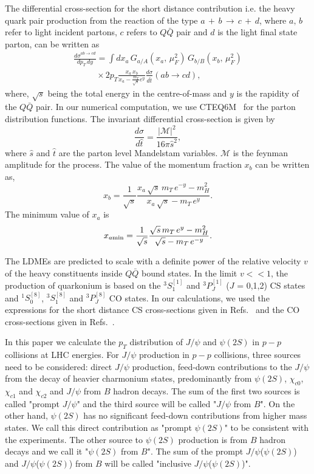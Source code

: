 \documentclass{iopart}
\def  \be   {\begin{equation}}
\def  \ee   {\end{equation}}
\def  \bea  {\begin{eqnarray}}
\def  \eea  {\end{eqnarray}}
\def  \nn   {\nonumber}
\begin{document}
The differential cross-section for the short distance contribution i.e. the heavy quark pair production from the reaction of the type $a\,+\,b\,\rightarrow\,c\,+\,d$, where $a,\, b$ refer  to light incident partons, $c$ refers to $Q\bar Q$ pair and $d$ is the light final state parton, can be written as~\cite{rmp59}
\bea
\frac{{d\sigma}^{ab\rightarrow cd}}{dp_T\,dy} = \int dx_a\, G_{a/A}(x_a,\,\mu^{2}_{F})\, G_{b/B}(x_b,\,\mu^{2}_{F})\nn\\
~~~~~~~~~~~~\times 2p_T \frac{x_a\,x_b}{x_a-\frac{m_T}{\sqrt{s}}e^y}\frac{d\sigma}{d\hat t}(ab\rightarrow cd),
\eea
where, $\sqrt{s}$ being the total energy in the centre-of-mass and $y$ is the rapidity of the $Q\bar Q$ pair. In our numerical computation, we use CTEQ6M~\cite{prd82} for the parton distribution functions. The invariant differential cross-section is given by
\be
\frac{d\sigma}{d\hat t} = \frac{|\mathcal{M}|^2}{16\pi{\hat s}^2},
\ee
where $\hat s$ and $\hat t$ are the parton level Mandelstam variables. $\mathcal{M}$ is the feynman amplitude for the process. The value of the momentum fraction $x_b$ can be written as,
\be
x_b = \frac{1}{\sqrt{s}}\frac{x_a\,\sqrt{s}\,m_T\,e^{-y}-m^2_H}{x_a\,\sqrt{s}-m_T\,e^y}.
\ee
The minimum value of $x_a$ is 
\be
x_{a\rm min} = \frac{1}{\sqrt{s}}\frac{\sqrt{s}\,m_T\,e^{y}-m^2_H}{\sqrt{s}-m_T\,e^{-y}}.
\ee

The LDMEs are predicted to scale with a definite power of the relative velocity $v$ of the heavy constituents inside $Q\bar Q$ bound states. In the limit $v<<1$, the production of quarkonium is based on the $^3S_1^{[1]}$ and $^3P_J^{[1]}$ ($J$ = 0,1,2) CS states and $^1S_0^{[8]}$, $^3S_1^{[8]}$ and $^3P_J^{[8]}$ CO states. In our calculations, we used the expressions for the short distance CS cross-sections given in Refs.~\cite{zpc19,npb291,plb184} and the CO cross-sections given in Refs.~\cite{prd53,prd53a}.

In this paper we calculate the $p_T$ distribution of $J/\psi$ and $\psi(2S)$ in $p-p$ collisions at LHC energies. For $J/\psi$ production in $p-p$ collisions, three sources need to be considered: direct $J/\psi$ production, feed-down contributions to the $J/\psi$ from the decay of heavier charmonium states, predominantly from $\psi(2S)$, $\chi_{c0}$, $\chi_{c1}$ and $\chi_{c2}$ and $J/\psi$ from $B$ hadron decays. The sum of the first two sources is called "prompt $J/\psi$" and the third source will be called "$J/\psi$ from $B$". On the other hand, $\psi(2S)$ has no significant feed-down contributions from higher mass states. We call this direct contribution as "prompt $\psi(2S)$" to be consistent with the experiments. The other source to $\psi(2S)$ production is from $B$ hadron decays and we call it "$\psi(2S)$ from $B$". The sum of the prompt $J/\psi$($\psi(2S)$) and $J/\psi$($\psi(2S)$) from $B$ will be called "inclusive $J/\psi$($\psi(2S)$)".
\end{document}
